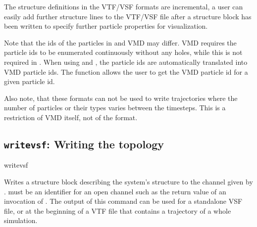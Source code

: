 The structure definitions in the VTF/VSF formats are incremental, \ie
a user can easily add further structure lines to the VTF/VSF file
after a structure block has been written to specify further particle
properties for visualization.

Note that the ids of the particles in \es and VMD may differ. VMD
requires the particle ids to be enumerated continuously without any
holes, while this is not required in \es. When using 
and , the \es particle ids are automatically translated
into VMD particle ids. The function  allows the user to
get the VMD particle id for a given \es particle id.

Also note, that these formats can not be used to write trajectories
where the number of particles or their types varies between the
timesteps. This is a restriction of VMD itself, not of the format.

\subsection{\texttt{writevsf}: Writing the topology}

\begin{essyntax}
  writevsf  
\end{essyntax}
Writes a structure block describing the system's structure to the
channel given by .  must be an
identifier for an open channel such as the return value of an
invocation of .  The output of this command can be used
for a standalone VSF file, or at the beginning of a VTF file that
contains a trajectory of a whole simulation.

